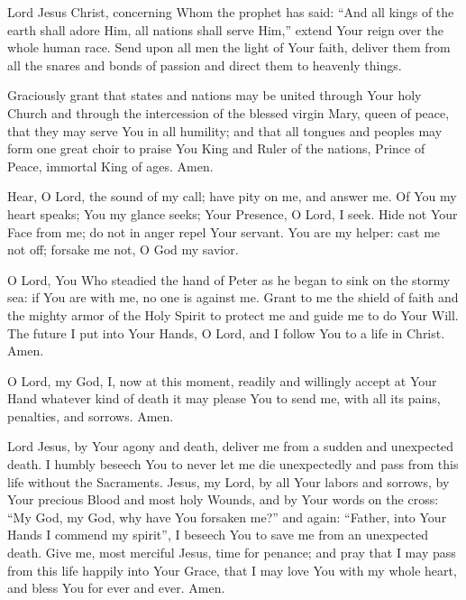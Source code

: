 Lord Jesus Christ, concerning Whom the prophet has said:
``And all kings of the earth shall adore Him, all nations shall serve Him,''
extend Your reign over the whole human race.
Send upon all men the light of Your faith, deliver them from all the snares and bonds of passion and direct them to heavenly things.

Graciously grant that states and nations may be united through Your holy Church and through the intercession of the blessed virgin Mary, queen of peace, that they may serve You in all humility;
and that all tongues and peoples may form one great choir to praise You King and Ruler of the nations, Prince of Peace, immortal King of ages.
Amen.

Hear, O Lord, the sound of my call;
have pity on me, and answer me.
Of You my heart speaks;
You my glance seeks;
Your Presence, O Lord, I seek.
Hide not Your Face from me; 
do not in anger repel Your servant.
You are my helper: cast me not off;
forsake me not, O God my savior.

O Lord, You Who steadied the hand of Peter as he began to sink on the stormy sea: if You are with me, no one is against me.
Grant to me the shield of faith and the mighty armor of the Holy Spirit to protect me and guide me to do Your Will.
The future I put into Your Hands, O Lord, and I follow You to a life in Christ.
Amen.

O Lord, my God, I, now at this moment, readily and willingly accept at Your Hand whatever kind of death it may please You to send me, with all its pains, penalties, and sorrows.
Amen.

Lord Jesus, by Your agony and death, deliver me from a sudden and unexpected death.
I humbly beseech You to never let me die unexpectedly and pass from this life without the Sacraments.
Jesus, my Lord, by all Your labors and sorrows, by Your precious Blood and most holy Wounds, and by Your words on the cross:
``My God, my God, why have You forsaken me?''
and again:
``Father, into Your Hands I commend my spirit'',
I beseech You to save me from an unexpected death.
Give me, most merciful Jesus, time for penance;
and pray that I may pass from this life happily into Your Grace, that I may love You with my whole heart, and bless You for ever and ever.
Amen.

